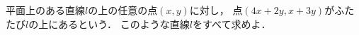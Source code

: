 \documentclass[../../main.tex]{subfiles}
\begin{document}
平面上のある直線$l$の上の任意の点$(x,y)$に対し，
点$(4x+2y,x+3y)$がふたたび$l$の上にあるという．
このような直線$l$をすべて求めよ．
\end{document}
